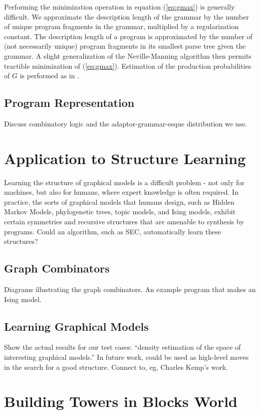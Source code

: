 \documentclass{article} %
\begin{document}
Performing the minimization operation in equation (\ref{eq:gmax}) is generally difficult.
We approximate the description length of the grammar by the number of unique program fragments in the grammar, multiplied by a regularization constant.
The description length of a program is approximated by the number of (not necessarily unique) program fragments in its smallest parse tree given the grammar.
A slight generalization of the Neville-Manning algorithm then permits tractible minimization of (\ref{eq:gmax}).
Estimation of the production probabilities of $G$ is performed as in \cite{ijcai}.

\subsection{Program Representation}
Discuss combinatory logic and the adaptor-grammar-esque distribution we use.

\section{Application to Structure Learning}
Learning the structure of graphical models is a difficult problem - not only for machines, but also for humans, where expert knowledge is often required.
In practice, the sorts of graphical models that humans design, such as Hidden Markov Models, phylogenetic trees, topic models, and Ising models, exhibit certain symmetries and recursive structures that are amenable to synthesis by programs.
Could an algorithm, such as SEC, automatically learn these structures?

\subsection{Graph Combinators}

Diagrams illustrating the graph combinators. An example program that makes an Ising model.

\subsection{Learning Graphical Models}

Show the actual results for our test cases: ``density estimation of the space of interesting graphical models.''
In future work, could be used as high-level moves in the search for a good structure.
Connect to, eg, Charles Kemp's work.

\section{Building Towers in Blocks World}
\end{document}
